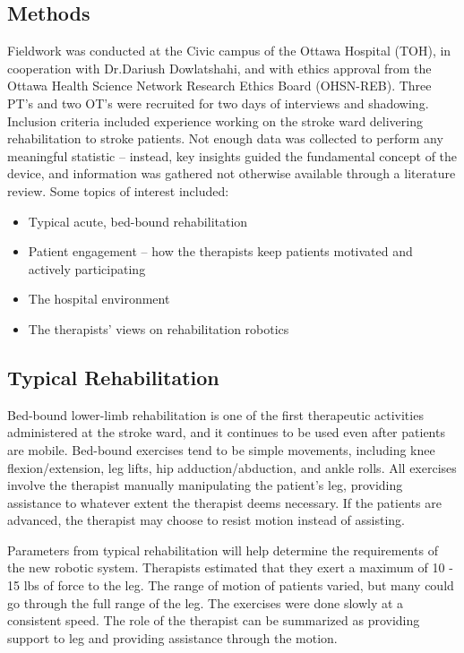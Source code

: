 \documentclass[12pt]{report}
\begin{document}
\subsection{Methods}

	Fieldwork was conducted at the Civic campus of the Ottawa Hospital (TOH), in cooperation with Dr.Dariush Dowlatshahi, and with ethics approval from the Ottawa Health Science Network Research Ethics Board (OHSN-REB). Three PT's and two OT's were recruited for two days of interviews and shadowing. Inclusion criteria included experience working on the stroke ward delivering rehabilitation to stroke patients. Not enough data was collected to perform any meaningful statistic -- instead, key insights guided the fundamental concept of the device, and information was gathered not otherwise available through a literature review. Some topics of interest included:
	
	\begin{itemize}
		\item Typical acute, bed-bound rehabilitation 
		\item Patient engagement -- how the therapists keep patients motivated and actively participating 
		\item The hospital environment
		\item The therapists' views on rehabilitation robotics 
	\end{itemize}



	\subsection{Typical Rehabilitation}
	

	
	Bed-bound lower-limb rehabilitation is one of the first therapeutic activities administered at the stroke ward, and it continues to be used even after patients are mobile. Bed-bound exercises tend to be simple movements, including knee flexion/extension, leg lifts, hip adduction/abduction, and ankle rolls. All exercises involve the therapist manually manipulating the patient's leg, providing assistance to whatever extent the therapist deems necessary. If the patients are advanced, the therapist may choose to resist motion instead of assisting. 
	
	Parameters from typical rehabilitation will help determine the requirements of the new robotic system. Therapists estimated that they exert a maximum of 10 - 15 lbs of force to the leg. The range of motion of patients varied, but many could go through the full range of the leg. The exercises were done slowly at a consistent speed. The role of the therapist can be summarized as providing support to leg and providing assistance through the motion. 
	
\end{document}
